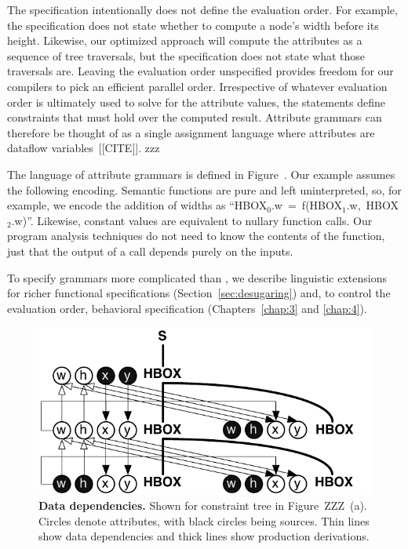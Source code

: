 The specification intentionally does not define the evaluation order. For example, the specification does not state whether to compute a node's width before its height. Likewise, our optimized approach will compute the attributes as a sequence of tree traversals, but the specification does not state what those traversals are. Leaving the evaluation order unspecified provides freedom for our compilers to pick an efficient parallel order. Irrespective of whatever evaluation order is ultimately used to solve for the attribute values, the statements define constraints that must hold over the computed result. Attribute grammars can therefore be thought of as a single assignment language where attributes are dataflow variables~[[CITE]].
zzz

The language of attribute grammars is defined in Figure~. 
Our example assumes the following encoding. Semantic functions are pure and left uninterpreted, so, for example, we encode the addition of widths as ``\mbox{HBOX$_0$.w = f(HBOX$_1$.w, HBOX$_2$.w)}''. Likewise, constant values are equivalent to nullary function calls. Our program analysis techniques do not need to know the contents of the function, just that the output of a call depends purely on the inputs. 

To specify grammars more complicated than \hlang{}, we describe linguistic extensions for richer functional specifications (Section~\ref{sec:desugaring}) and, to control the evaluation order, behavioral specification (Chapters~\ref{chap:3} and \ref{chap:4}).

\begin{figure}
\centering
\includegraphics[trim=0 0 0 0,clip,width=0.8\columnwidth]{chapter2/deps}
\caption{\textbf{Data dependencies.} Shown for constraint tree  in Figure~ZZZ~(a). Circles denote attributes, with black circles being  sources. Thin lines show data dependencies and thick lines show production derivations.}
\label{fig:deps}
\end{figure}

